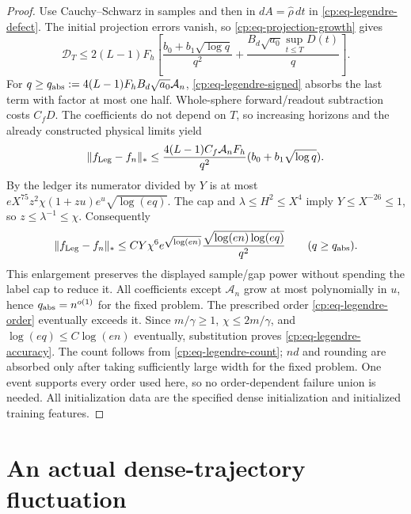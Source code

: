 \begin{proof}
Use Cauchy--Schwarz in samples and then in $dA=\widehat\rho\,dt$
in \eqref{cp:eq-legendre-defect}.  The initial projection errors vanish,
so \eqref{cp:eq-projection-growth} gives
\begin{equation}
 \mathcal D_T\le2(L-1)F_h\left[
 \frac{b_0+b_1\sqrt{\log q}}{q^2}
 +\frac{B_d\sqrt{a_0}\sup_{t\le T}D(t)}q\right].
 \label{cp:eq-legendre-absorption}
\end{equation}
For
$q\ge q_{\rm abs}:=4(L-1)F_hB_d\sqrt{a_0}\mathcal A_n$,
\eqref{cp:eq-legendre-signed} absorbs the last term with factor
at most one half.  Whole-sphere forward/readout subtraction costs
$C_fD$.  The coefficients do not depend on $T$, so increasing horizons
and the already constructed physical limits yield
\[
 \|f_{\rm Leg}-f_n\|_*
 \le\frac{4(L-1)C_f\mathcal A_nF_h}{q^2}
                         (b_0+b_1\sqrt{\log q}).
\]
By the ledger its numerator divided by $Y$ is at most
$eX^{75}z^2\chi(1+zu)e^u\sqrt{\log(eq)}$.
The cap and $\lambda\le H^2\le X^4$ imply $Y\le X^{-26}\le1$,
so $z\le\lambda^{-1}\le\chi$.  Consequently
\begin{equation}
 \|f_{\rm Leg}-f_n\|_*
 \le C Y\chi^6 e^{\sqrt{\log(en)}}
       \frac{\sqrt{\log(en)\log(eq)}}{q^2}\qquad(q\ge q_{\rm abs}).
 \label{cp:eq-legendre-forward}
\end{equation}
This enlargement preserves the displayed sample/gap power without
spending the label cap to reduce it.  All coefficients except
$\mathcal A_n$ grow at most polynomially in $u$, hence
$q_{\rm abs}=n^{o(1)}$ for the fixed problem.  The prescribed order
\eqref{cp:eq-legendre-order} eventually exceeds it.  Since
$m/\gamma\ge1$, $\chi\le2m/\gamma$, and
$\log(eq)\le C\log(en)$ eventually, substitution proves
\eqref{cp:eq-legendre-accuracy}.  The count follows from
\eqref{cp:eq-legendre-count}; $nd$ and rounding are absorbed only after
taking sufficiently large width for the fixed problem.  One event
supports every order used here, so no order-dependent failure union is
needed.  All initialization data are the specified dense initialization
and initialized training features.
\end{proof}

\section{An actual dense-trajectory fluctuation}
\label{cp:dense-lower-section}

